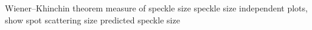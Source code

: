 Wiener–Khinchin theorem
measure of speckle size
speckle size independent
plots, show spot scattering size
predicted speckle size
